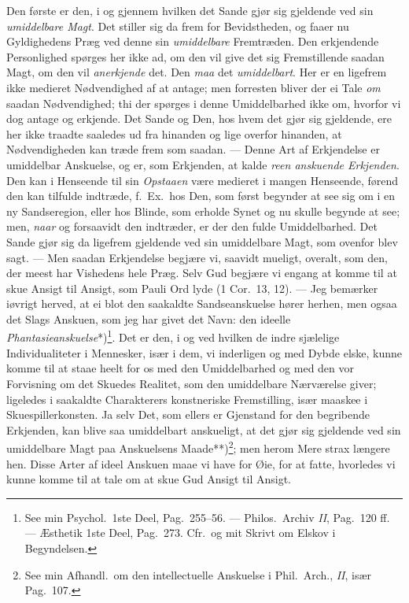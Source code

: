 \documentclass[12pt,a4paper]{book}
\newcommand{\apage}[1]{\marginnote{\footnotesize\textit{[#1]}}}
\begin{document}
%
Den første er den, i og gjennem hvilken det Sande gjør sig gjeldende ved
sin \emph{umiddelbare Magt}. Det stiller sig da frem for Bevidstheden, og faaer nu
Gyldighedens Præg ved denne sin \emph{umiddelbare} Fremtræden. Den erkjendende
Personlighed spørges her ikke ad, om den vil give det sig Fremstillende
saadan Magt, om den vil \emph{anerkjende} det. Den \emph{maa} det \emph{umiddelbart}. Her er en
ligefrem ikke medieret Nødvendighed af at antage; men forresten bliver der
ei Tale \emph{om} saadan Nødvendighed; thi der spørges i denne Umiddelbarhed ikke
om, hvorfor vi dog antage og erkjende. Det Sande og Den, hos hvem det gjør
sig gjeldende, \apage{100} ere her ikke traadte saaledes ud fra hinanden og lige
overfor hinanden, at Nødvendigheden kan træde frem som saadan. --- Denne
Art af Erkjendelse er umiddelbar Anskuelse, og er, som Erkjenden, at kalde
\emph{reen anskuende Erkjenden}. Den kan i Henseende til sin \emph{Opstaaen} være
medieret i mangen Henseende, førend den kan tilfulde indtræde, f.\ Ex.\ hos
Den, som først begynder at see sig om i en ny Sandseregion, eller hos
Blinde, som erholde Synet og nu skulle begynde at see; men, \emph{naar} og
forsaavidt den indtræder, er der den fulde Umiddelbarhed. Det Sande gjør
sig da ligefrem gjeldende ved sin umiddelbare Magt, som ovenfor blev sagt.
--- Men saadan Erkjendelse begjære vi, saavidt mueligt, overalt, som den,
der meest har Vishedens hele Præg. Selv Gud begjære vi engang at komme til
at skue Ansigt til Ansigt, som Pauli Ord lyde (1 Cor.\ 13, 12). --- Jeg
bemærker iøvrigt herved, at ei blot den saakaldte Sandseanskuelse hører
herhen, men ogsaa det Slags Anskuen, som jeg har givet det Navn: den
ideelle \emph{Phantasieanskuelse}*)\footnote{See min Psychol.\ 1ste Deel, Pag.\
255--56. --- Philos.\ Archiv \textit{II}, Pag.\ 120 ff. --- Æsthetik 1ste Deel,
Pag.\ 273. Cfr.\ og mit Skrivt om Elskov i Begyndelsen.}. Det er den, i og
ved hvilken de indre sjælelige Individualiteter i Mennesker, især i dem, vi
inderligen og med Dybde elske, kunne komme til at staae heelt for os med
den Umiddelbarhed og med den vor Forvisning om det Skuedes Realitet, som
den umiddelbare Nærværelse giver; ligeledes i saakaldte Charakterers
konstneriske Fremstilling, især maaskee i Skuespillerkonsten. Ja selv Det,
som ellers er Gjenstand for den begribende Erkjenden, kan blive saa
umiddelbart anskueligt, at det gjør sig gjeldende ved sin umiddelbare Magt
paa Anskuelsens Maade**)\footnote{See min Afhandl.\ om den intellectuelle
Anskuelse i Phil.\ Arch., \textit{II}, især Pag.\ 107.}; men herom Mere \apage{101} strax
længere hen. Disse Arter af ideel Anskuen maae vi have for Øie, for at
fatte, hvorledes vi kunne komme til at tale om at skue Gud Ansigt til
Ansigt.
\end{document}

